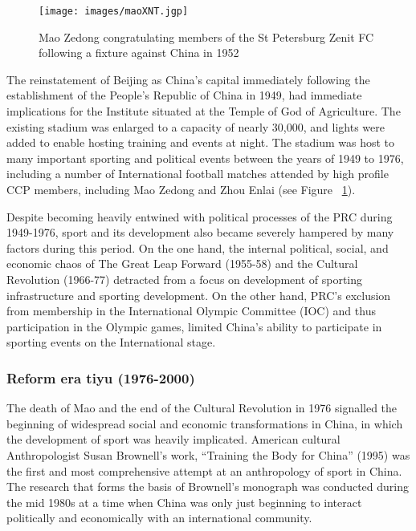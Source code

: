\begin{CJK}{UTF8}{gbsn}
\begin{figure}[htbp]
  \texttt{[image: images/maoXNT.jgp]}
  \caption{Mao Zedong congratulating members of the St Petersburg Zenit FC following a fixture against China in 1952}
  \label{fig:maoXNT}
\end{figure}

The reinstatement of Beijing as China's capital immediately following the establishment of the People's Republic of China in 1949, had immediate implications for the Institute situated at the Temple of God of Agriculture.  The existing stadium was enlarged to a capacity of nearly 30,000, and lights were added to enable hosting training and events at night.  The stadium was host to many important sporting and political events between the years of 1949 to 1976, including a number of International football matches attended by high profile CCP members, including Mao Zedong and Zhou Enlai (see Figure ~\ref{fig:maoXNT}).

Despite becoming heavily entwined with political processes of the PRC during 1949-1976, sport and its development also became severely hampered by many factors during this period.  On the one hand, the internal political, social, and economic chaos of The Great Leap Forward (1955-58) and the Cultural Revolution (1966-77) detracted from a focus on development of sporting infrastructure and sporting development.  On the other hand, PRC's exclusion from membership in the International Olympic Committee (IOC) and thus participation in the Olympic games, limited China's ability to participate in sporting events on the International stage.






\subsubsection{Reform era tiyu (1976-2000)}
The death of Mao and the end of the Cultural Revolution in 1976 signalled the beginning of widespread social and economic transformations in China, in which the development of sport was heavily implicated.  American cultural Anthropologist Susan Brownell’s work, ``Training the Body for China'' (1995) was the first and most comprehensive attempt at an anthropology of sport in China. The research that forms the basis of Brownell's monograph was conducted during the mid 1980s at a time when China was only just beginning to interact politically and economically with an international community.


\end{CJK}
